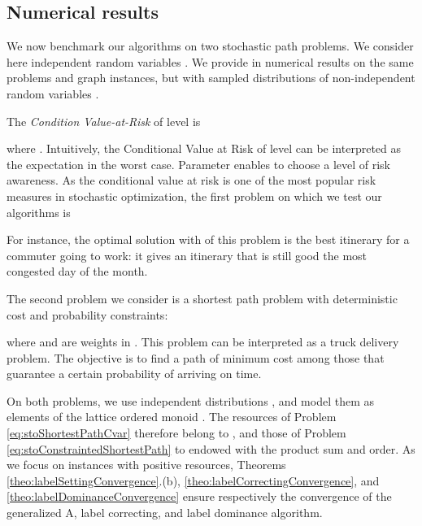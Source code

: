 \documentclass[11pt]{amsart}
\theoremstyle{plain}
\theoremstyle{remark}
\begin{document}
\subsection{Numerical results} 

We now benchmark our algorithms on two stochastic path problems. We consider here independent random variables . We provide in \cite{parmentier2016thesis} numerical results on the same problems and graph instances, but with sampled distributions of non-independent random variables .


The \emph{Condition Value-at-Risk} \cite{rockafellar2000optimization}
 of level  is

where . Intuitively, the Conditional Value at Risk of level  can be interpreted as the expectation in the  worst case. Parameter  enables to choose a level of risk awareness. 
As the conditional value at risk is one of the most popular risk measures in stochastic optimization, the first problem on which we test our algorithms is

For instance, the optimal solution with  of this problem is the best itinerary for a commuter going to work: it gives an itinerary that is still good the most congested day of the month.

The second problem we consider is a shortest path problem with deterministic cost and probability constraints:

where  and  are weights in . This problem can be interpreted as a truck delivery problem. The objective is to find a path of minimum cost among those that guarantee a certain probability of arriving on time. 

On both problems, we use independent distributions , and model them as elements of the lattice ordered monoid . The resources of Problem \eqref{eq:stoShortestPathCvar} therefore belong to , and those of Problem \eqref{eq:stoConstraintedShortestPath} to  endowed with the product sum and order. As we focus on instances with positive resources, Theorems \ref{theo:labelSettingConvergence}.(b), \ref{theo:labelCorrectingConvergence}, and \ref{theo:labelDominanceConvergence} ensure respectively the convergence of the generalized A, label correcting, and label dominance algorithm. 
\end{document}

